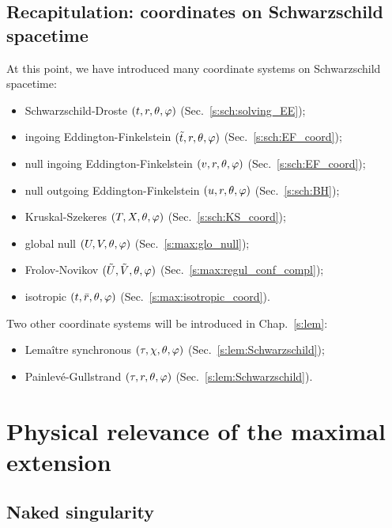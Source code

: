 \subsection{Recapitulation: coordinates on Schwarzschild spacetime}

At this point, we have introduced many coordinate systems on Schwarzschild spacetime:
\begin{itemize}
\item Schwarzschild-Droste $(t,r,\theta,\varphi)$ (Sec.~\ref{s:sch:solving_EE});
\item ingoing Eddington-Finkelstein $(\tilde{t},r,\theta,\varphi)$ (Sec.~\ref{s:sch:EF_coord});
\item null ingoing Eddington-Finkelstein $(v,r,\theta,\varphi)$ (Sec.~\ref{s:sch:EF_coord});
\item null outgoing Eddington-Finkelstein $(u,r,\theta,\varphi)$ (Sec.~\ref{s:sch:BH});
\item Kruskal-Szekeres $(T,X,\theta,\varphi)$ (Sec.~\ref{s:sch:KS_coord});
\item global null $(U,V,\theta,\varphi)$ (Sec.~\ref{s:max:glo_null});
\item Frolov-Novikov $(\tilde{U},\tilde{V},\theta,\varphi)$ (Sec.~\ref{s:max:regul_conf_compl});
\item isotropic $(t,\bar{r},\theta,\varphi)$ (Sec.~\ref{s:max:isotropic_coord}).
\end{itemize}
Two other coordinate systems will be introduced in Chap.~\ref{s:lem}:
\begin{itemize}
\item Lemaître synchronous $(\tau,\chi,\theta,\varphi)$ (Sec.~\ref{s:lem:Schwarzschild});
\item Painlevé-Gullstrand $(\tau,r,\theta,\varphi)$ (Sec.~\ref{s:lem:Schwarzschild}).
\end{itemize}


\section{Physical relevance of the maximal extension} \label{s:max:relevance}

\subsection{Naked singularity} \label{s:max:naked_sing}

